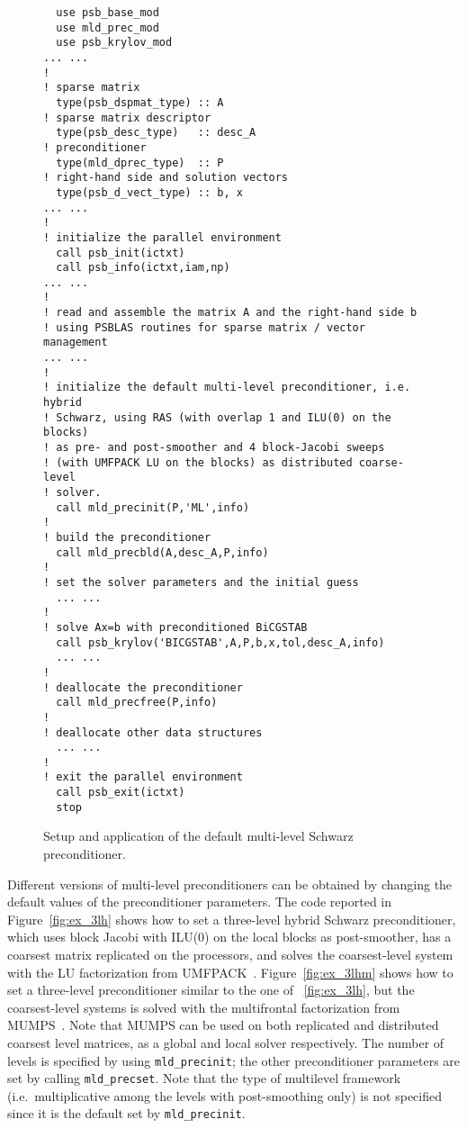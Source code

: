 \begin{figure}[tbp]
\begin{center}
\begin{minipage}{.90\textwidth} 
{\small
\begin{verbatim}
  use psb_base_mod
  use mld_prec_mod
  use psb_krylov_mod
... ...
!
! sparse matrix
  type(psb_dspmat_type) :: A
! sparse matrix descriptor
  type(psb_desc_type)   :: desc_A
! preconditioner
  type(mld_dprec_type)  :: P
! right-hand side and solution vectors
  type(psb_d_vect_type) :: b, x
... ...
!
! initialize the parallel environment
  call psb_init(ictxt)
  call psb_info(ictxt,iam,np)
... ...
!
! read and assemble the matrix A and the right-hand side b 
! using PSBLAS routines for sparse matrix / vector management 
... ...
!
! initialize the default multi-level preconditioner, i.e. hybrid
! Schwarz, using RAS (with overlap 1 and ILU(0) on the blocks) 
! as pre- and post-smoother and 4 block-Jacobi sweeps 
! (with UMFPACK LU on the blocks) as distributed coarse-level 
! solver.
  call mld_precinit(P,'ML',info)
!
! build the preconditioner
  call mld_precbld(A,desc_A,P,info)
!
! set the solver parameters and the initial guess
  ... ...
!
! solve Ax=b with preconditioned BiCGSTAB
  call psb_krylov('BICGSTAB',A,P,b,x,tol,desc_A,info)
  ... ...
!
! deallocate the preconditioner
  call mld_precfree(P,info)
!
! deallocate other data structures
  ... ...
!
! exit the parallel environment
  call psb_exit(ictxt)
  stop
\end{verbatim}
}
\end{minipage}
\caption{Setup and application of the default multi-level Schwarz preconditioner.
\label{fig:ex_default}}
\end{center}
\end{figure}

Different versions of multi-level preconditioners can be obtained by changing
the default values of the preconditioner parameters. The code reported in
Figure~\ref{fig:ex_3lh} shows how to set a three-level hybrid Schwarz
preconditioner, which uses block Jacobi with ILU(0) on the
local blocks as post-smoother, has a coarsest matrix replicated on the processors,
and solves the coarsest-level system with the LU factorization from UMFPACK~\cite{UMFPACK}.
Figure~\ref{fig:ex_3lhm} shows how to set a three-level preconditioner
similar to the one of ~\ref{fig:ex_3lh}, but the coarsest-level
systems is solved with the multifrontal factorization from
MUMPS~\cite{UMFPACK}.  
Note that MUMPS can be used on both replicated and distributed
coarsest level matrices,  as a global and local solver respectively.   
The number of levels is specified by using \verb|mld_precinit|; the other
preconditioner parameters are set by calling \verb|mld_precset|. Note that
the type of multilevel framework (i.e.\ multiplicative among the levels
with post-smoothing only) is not specified since it is the default 
set by \verb|mld_precinit|. 


